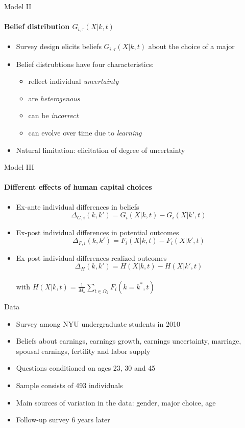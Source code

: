\documentclass[12pt]{beamer}
\begin{document}
\begin{frame}{Model II}
    \framesubtitle{Belief distribution $G_{i,\tau}(X|k,t)$}
    \begin{itemize}
        \item Survey design elicits beliefs $G_{i,\tau}(X|k,t)$ about the choice of a major
        \item Belief distrubtions have four characteristics:
        \begin{itemize}
            \item reflect individual \textit{uncertainty}
            \item are \textit{heterogenous}
            \item can be \textit{incorrect}
            \item can evolve over time due to \textit{learning}
        \end{itemize}
        \item Natural limitation: elicitation of degree of uncertainty
    \end{itemize}
\end{frame}

\begin{frame}{Model III}
    \framesubtitle{Different effects of human capital choices}
    \begin{itemize}
        \item Ex-ante individual differences in beliefs
        $$ \Delta_{G,i}(k,k') = G_i(X|k,t) - G_i(X|k',t) $$
        \item Ex-post individual differences in potential outcomes
        $$ \Delta_{F,i}(k,k') = F_i(X|k,t) - F_i(X|k',t) $$
        \item Ex-post individual differences realized outcomes
        $$ \Delta_{H}(k,k') = H(X|k,t) - H(X|k',t) $$ \\
        with $H(X|k,t) = \frac{1}{M_k} \sum_{t \in \Omega_k} F_i(k = k^*,t)$
    \end{itemize}
    
\end{frame}

\begin{frame}{Data}
    \begin{itemize}
        \item Survey among NYU undergraduate students in 2010
        \item Beliefs about earnings, earnings growth, earnings uncertainty, marriage, spousal earnings, fertility and labor supply
        \item Questions conditioned on ages 23, 30 and 45
        \item Sample consists of 493 individuals
        \item Main sources of variation in the data: gender, major choice, age
        \item Follow-up survey 6 years later
    \end{itemize}
\end{frame}
\end{document}
